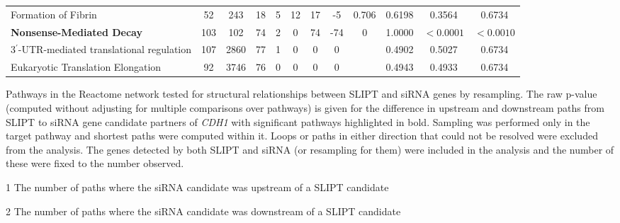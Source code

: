 \begin{table*}[!tb]
{{\begin{threeparttable}
\begin{tabular}{l|cc|cc|cccc|cc|c}
\rowcolor{black!10}
Formation of Fibrin                       & 52          & 243          & 18            & 5           & 12   & 17   & -5      & 0.706        & 0.6198             & 0.3564    & 0.6734            \\
\rowcolor{black!5}
\textbf{Nonsense-Mediated Decay}                   & 103         & 102          & 74            & 2           & 0    & 74   & -74     & 0            & 1.0000             & $<0.0001$  & $<0.0010$                \\
\rowcolor{black!10}
3$^\prime$-UTR-mediated translational regulation & 107         & 2860         & 77            & 1           & 0    & 0    & 0       &              & 0.4902             & 0.5027   & 0.6734             \\
\rowcolor{black!5}
Eukaryotic Translation Elongation         & 92          & 3746         & 76            & 0           & 0    & 0    & 0       &              & 0.4943             & 0.4933   & 0.6734             \\
\hline
\end{tabular}
\begin{tablenotes}
\raggedright \small
Pathways in the Reactome network tested for structural relationships between \gls{SLIPT} and \gls{siRNA} genes by resampling. The raw p-value (computed without adjusting for multiple comparisons over \glspl{pathway}) is given for the difference in upstream and downstream paths from \gls{SLIPT} to \gls{siRNA} gene candidate partners of \textit{CDH1} with significant \glspl{pathway} highlighted in bold. Sampling was performed only in the target \gls{pathway} and \glspl{shortest path} were computed within it. Loops or paths in either direction that could not be resolved were excluded from the analysis. The genes detected by both \gls{SLIPT} and \gls{siRNA} (or resampling for them) were included in the analysis and the number of these were fixed to the number observed.

\item[1] The number of paths where the \gls{siRNA} candidate was upstream of a \gls{SLIPT} candidate

\item[2] The number of paths where the \gls{siRNA} candidate was downstream of a \gls{SLIPT} candidate
\end{tablenotes}
\end{threeparttable}
}
}
\end{table*}

